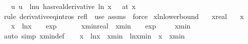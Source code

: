 \begin{isabellebody}
\ \ \ {\isachardoublequoteopen}{\isacharparenleft}{\kern0pt}{\isacharparenleft}{\kern0pt}{\isasymlambda}u{\isachardot}{\kern0pt}\ u\ {\isacharasterisk}{\kern0pt}\ ln{\isacharparenleft}{\kern0pt}u{\isacharparenright}{\kern0pt}{\isacharparenright}{\kern0pt}\ has{\isacharunderscore}{\kern0pt}real{\isacharunderscore}{\kern0pt}derivative\ ln\ x\ {\isacharplus}{\kern0pt}\ {}{\isacharparenright}{\kern0pt}\ {\isacharparenleft}{\kern0pt}at\ x{\isacharparenright}{\kern0pt}{\isachardoublequoteclose}\isanewline
%
\isadelimproof
\ \ %
\endisadelimproof
%
\isatagproof
{}\isamarkupfalse%
\ {\isacharparenleft}{\kern0pt}rule\ derivative{\isacharunderscore}{\kern0pt}eq{\isacharunderscore}{\kern0pt}intros\ refl\ {\isacharbar}{\kern0pt}\ use\ assms\ \ force{\isacharparenright}{\kern0pt}{\isacharplus}{\kern0pt}%
\endisatagproof
{\isafoldproof}%
%
\isadelimproof
\isanewline
%
\endisadelimproof
\isanewline
{}\isamarkupfalse%
\ x{\isacharunderscore}{\kern0pt}ln{\isacharunderscore}{\kern0pt}lowerbound{\isacharcolon}{\kern0pt}\isanewline
\ \ \ x{\isacharcolon}{\kern0pt}{\isacharcolon}{\kern0pt}real\isanewline
\ \ \ {\isachardoublequoteopen}x\ {\isasymge}\ {}{\isachardoublequoteclose}\isanewline
\ \ \ {\isachardoublequoteopen}x\ {\isacharasterisk}{\kern0pt}\ ln{\isacharparenleft}{\kern0pt}x{\isacharparenright}{\kern0pt}\ {\isasymge}\ {\isacharminus}{\kern0pt}{}\ {\isacharslash}{\kern0pt}\ exp\ {}{\isachardoublequoteclose}\isanewline
%
\isadelimproof
%
\endisadelimproof
%
\isatagproof
{}\isamarkupfalse%
\ {\isacharminus}{\kern0pt}\isanewline
\ \ \isamarkupfalse%
\ xmin{\isacharcolon}{\kern0pt}{\isacharcolon}{\kern0pt}real\ \ {\isachardoublequoteopen}xmin\ {\isasymequiv}\ {}\ {\isacharslash}{\kern0pt}\ exp\ {}{\isachardoublequoteclose}\isanewline
\ \ \isamarkupfalse%
\ {\isachardoublequoteopen}xmin\ {\isachargreater}{\kern0pt}\ {}{\isachardoublequoteclose}\isanewline
\ \ \ \ \isamarkupfalse%
\ {\isacharparenleft}{\kern0pt}auto\ simp{\isacharcolon}{\kern0pt}\ xmin{\isacharunderscore}{\kern0pt}def{\isacharparenright}{\kern0pt}\isanewline
\ \ \isamarkupfalse%
\ {\isachardoublequoteopen}x\ {\isacharasterisk}{\kern0pt}\ ln{\isacharparenleft}{\kern0pt}x{\isacharparenright}{\kern0pt}\ {\isachargreater}{\kern0pt}\ xmin\ {\isacharasterisk}{\kern0pt}\ ln{\isacharparenleft}{\kern0pt}xmin{\isacharparenright}{\kern0pt}{\isachardoublequoteclose}\ \ {\isachardoublequoteopen}x\ {\isacharless}{\kern0pt}\ xmin{\isachardoublequoteclose}\isanewline

\end{isabellebody}
